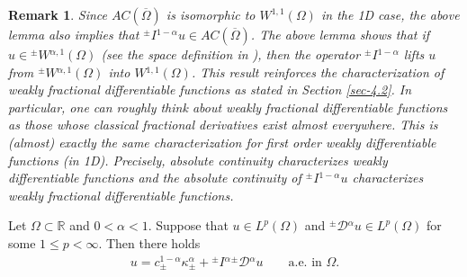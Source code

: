\documentclass[leqno,final]{siamltex}
\numberwithin{equation}{section}
\newtheorem{remark}{Remark}[section]
\newcommand{\Ome}{{\Omega}}
\renewcommand{\(}{\bigl(}
\renewcommand{\)}{\bigr)}
\newcommand{\R}{\mathbb{R}}
\begin{document}
	\begin{remark}
	Since $AC(\overline{\Omega})$ is isomorphic to $W^{1,1}(\Omega)$ in the 1D case, 
	the above lemma also implies that ${^{\pm}}{I}{^{1-\alpha}}u \in AC(\overline{\Omega})$. The above lemma shows that 
	if $u \in {^{\pm}}{W}{^{\alpha,1}}(\Omega)$ (see the space definition in \cite{Feng_Sutton1a}),
	then the operator ${^{\pm}}{I}{^{1-\alpha}}$ lifts $u$ from 
	${^{\pm}}{W}{^{\alpha,1}}(\Ome)$ into ${W}{^{1,1}}(\Ome)$. This result reinforces the characterization of weakly fractional differentiable functions as stated in Section \ref{sec-4.2}. In particular, 
	one can roughly think about weakly fractional differentiable functions as those whose classical fractional derivatives exist almost everywhere. This is (almost) exactly the same characterization 
	for first order weakly differentiable functions (in 1D). Precisely, absolute continuity characterizes weakly differentiable functions and the absolute continuity of 
	${^{\pm}}{I}{^{1-\alpha}}u$ characterizes weakly fractional differentiable 
	functions. 
	\end{remark}
	


   \begin{theorem}\label{FTWFC}
       Let $\Omega\subset \R$ and $0 < \alpha <1$. Suppose that $u \in L^{p}(\Omega)$ and  ${^{\pm}}{\mathcal{D}}{^{\alpha}}u \in L^{p}(\Omega)$ for some $1\leq p < \infty$. Then
       there holds
       \begin{align}\label{WeakFTFC}
           u = c^{1-\alpha}_{\pm} \kappa^{\alpha}_{\pm}  + {^{\pm}}{I}{^{\alpha}}{^{\pm}}{\mathcal{D}}{^{\alpha}} u \qquad
           \mbox{a.e. in } \Omega.
       \end{align}
  
   \end{theorem}
\end{document}
